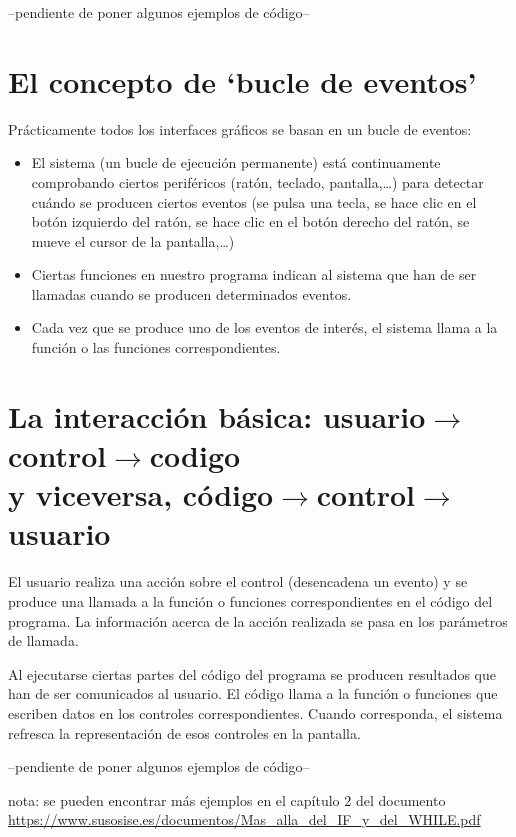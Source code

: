 \documentclass[spanish,12pt,a4paper,final,oneside]{book}
\begin{document}
--pendiente de poner algunos ejemplos de código--

\section{El concepto de `bucle de eventos'}

Prácticamente todos los interfaces gráficos se basan en un bucle de eventos:
\begin{itemize}
\item El sistema (un bucle de ejecución permanente) está continuamente comprobando ciertos periféricos (ratón, teclado, pantalla,\ldots) para detectar cuándo se producen ciertos eventos (se pulsa una tecla, se hace clic en el botón izquierdo del ratón, se hace clic en el botón derecho del ratón, se mueve el cursor de la pantalla,\ldots)
\item Ciertas funciones en nuestro programa indican al sistema que han de ser llamadas cuando se producen determinados eventos.
\item Cada vez que se produce uno de los eventos de interés, el sistema llama a la función o las funciones correspondientes.
\end{itemize}

\section{La interacción básica: usuario$\rightarrow$control$\rightarrow$codigo \\  y viceversa, código$\rightarrow$control$\rightarrow$usuario}

El usuario realiza una acción sobre el control (desencadena un evento) y se produce una llamada a la función o funciones correspondientes en el código del programa. La información acerca de la acción realizada se pasa en los parámetros de llamada.

Al ejecutarse ciertas partes del código del programa se producen resultados que han de ser comunicados al usuario. El código llama a la función o funciones que escriben datos en los controles correspondientes. Cuando corresponda, el sistema refresca la representación de esos controles en la pantalla.

\vspace{1cm}
--pendiente de poner algunos ejemplos de código--

\vspace{1cm}
nota: se pueden encontrar más ejemplos en el capítulo  2 del documento \url{https://www.susosise.es/documentos/Mas_alla_del_IF_y_del_WHILE.pdf}
\end{document}
